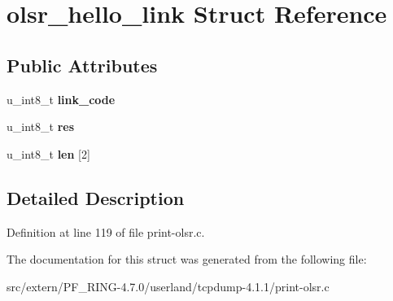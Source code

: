 \hypertarget{structolsr__hello__link}{
\section{olsr\_\-hello\_\-link Struct Reference}
\label{structolsr__hello__link}
}
\subsection*{Public Attributes}
\begin{DoxyCompactItemize}
\item 
\hypertarget{structolsr__hello__link_a6a301ec28ec9e26157fc9e9f0d2972d6}{
u\_\-int8\_\-t {\bfseries link\_\-code}}
\label{structolsr__hello__link_a6a301ec28ec9e26157fc9e9f0d2972d6}

\item 
\hypertarget{structolsr__hello__link_abe96e7d8a198301b627513604bd3c7f1}{
u\_\-int8\_\-t {\bfseries res}}
\label{structolsr__hello__link_abe96e7d8a198301b627513604bd3c7f1}

\item 
\hypertarget{structolsr__hello__link_a19a5822e5ca5b61fdce4d20b87bb6224}{
u\_\-int8\_\-t {\bfseries len} \mbox{[}2\mbox{]}}
\label{structolsr__hello__link_a19a5822e5ca5b61fdce4d20b87bb6224}

\end{DoxyCompactItemize}


\subsection{Detailed Description}


Definition at line 119 of file print-\/olsr.c.



The documentation for this struct was generated from the following file:\begin{DoxyCompactItemize}
\item 
src/extern/PF\_\-RING-\/4.7.0/userland/tcpdump-\/4.1.1/print-\/olsr.c\end{DoxyCompactItemize}
